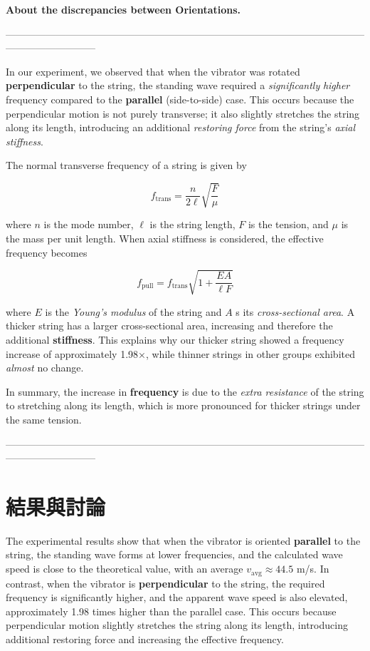 \documentclass[12pt]{article}
\begin{document}
{\textbf{About the discrepancies between Orientations.}

\noindent
---------------------------------------------------------------------------------------------------------------------------------------

In our experiment, we observed that when the vibrator was rotated \textbf{perpendicular} to the string, the standing wave required a \textit{significantly} \textit{higher} frequency compared to the \textbf{parallel} (side-to-side) case. This occurs because the perpendicular motion is not purely transverse; it also slightly stretches the string along its length, introducing an additional \textit{restoring force} from the string’s \textit{axial stiffness}.

The normal transverse frequency of a string is given by

\[f_\text{trans} = \frac{n}{2\ell} \sqrt{\frac{F}{\mu}}\]

where  $n$ is the mode number, $\ell$ is the string length, $F$ is the tension, and  $\mu$ is the mass per unit length. When axial stiffness is considered, the effective frequency becomes

\[f_\text{pull} = f_\text{trans} \sqrt{1 + \frac{EA}{\ell F}}\]

where $E$  is the \textit{Young’s modulus} of the string and $A$ s its \textit{cross-sectional area}. A thicker string has a larger cross-sectional area, increasing  and therefore the additional \textbf{stiffness}. This explains why our thicker string showed a frequency increase of approximately 1.98×, while thinner strings in other groups exhibited \textit{almost} no change.

In summary, the increase in \textbf{frequency }is due to the \textit{extra resistance} of the string to stretching along its length, which is more pronounced for thicker strings under the same tension.

\vspace{0.5cm}
\noindent
---------------------------------------------------------------------------------------------------------------------------------------

\section{\textbf{結果與討論}}
The experimental results show that when the vibrator is oriented \textbf{parallel} to the string, the standing wave forms at lower frequencies, and the calculated wave speed is close to the theoretical value, with an average $v_\text{avg} \approx 44.5$ m/s. In contrast, when the vibrator is \textbf{perpendicular} to the string, the required frequency is significantly higher, and the apparent wave speed is also elevated, approximately 1.98 times higher than the parallel case. This occurs because perpendicular motion slightly stretches the string along its length, introducing additional restoring force and increasing the effective frequency.

}
\end{document}
